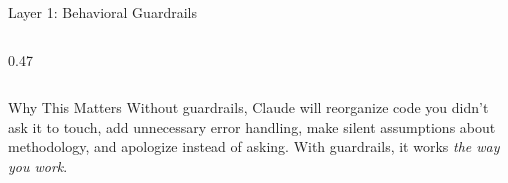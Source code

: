 \documentclass[aspectratio=169,11pt]{beamer}
\begin{document}
\begin{frame}[shrink=8]{Layer 1: Behavioral Guardrails}
\begin{columns}[T]
\begin{column}{0.47\textwidth}
\end{column}
\end{columns}

\smallskip

\begin{exampleblock}{Why This Matters}
\small Without guardrails, Claude will reorganize code you didn't ask it to touch, add unnecessary error handling, make silent assumptions about methodology, and apologize instead of asking.
With guardrails, it works \textit{the way you work}.
\end{exampleblock}

\end{frame}

\end{document}
